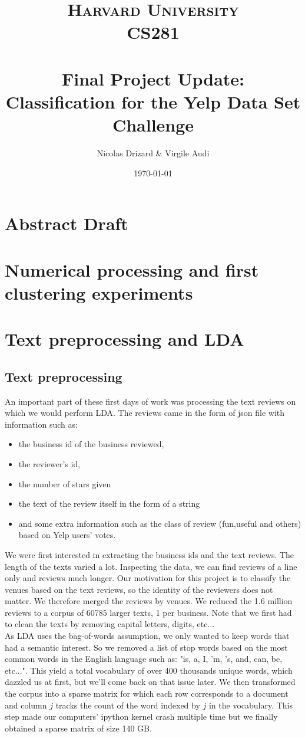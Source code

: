 \documentclass[paper=a4, fontsize=11pt]{scrartcl} %
\title{	
\normalfont \normalsize 
\textsc{Harvard University} \\[25pt]
\textsc{CS281} \\[25pt]
\horrule{0.5pt} \\[0.4cm] 
\huge Final Project Update: \\
\huge Classification for the Yelp Data Set Challenge
\horrule{2pt} \\[0.5cm]
}
\author{Nicolas Drizard \& Virgile Audi}
\date{\normalsize\today}
\numberwithin{equation}{section}
\numberwithin{figure}{section}
\numberwithin{table}{section}
\begin{document}
\maketitle

\section{Abstract Draft}

\section{Numerical processing and first clustering experiments}

\section{Text preprocessing and LDA}
\subsection{Text preprocessing}
An important part of these first days of work was processing the text reviews on which we would perform LDA. The reviews came in the form of json file with information such as:
\begin{itemize}
\item the business id of the business reviewed,
\item the reviewer's id,
\item the number of stars given
\item the text of the review itself in the form of a string
\item and some extra information such as the class of review (fun,useful and others) based on Yelp users' votes.
\end{itemize}

We were first interested in extracting the business ids and the text reviews. The length of the texts varied a lot. Inspecting the data, we can find reviews of a line only and reviews much longer. Our motivation for this project is to classify the venues based on the text reviews, so the identity of the reviewers does not matter. We therefore merged the reviews by venues. We reduced the 1.6 million reviews to a corpus of 60785 larger texts, 1 per business. Note that we first had to clean the texts by removing capital letters, digits, etc... \\

As LDA uses the bag-of-words assumption, we only wanted to keep words that had a semantic interest. So we removed a list of stop words based on the most common words in the English language such as: "is, a, I, 'm, 's, and, can, be, etc...". This yield a total vocabulary of over 400 thousands unique words, which dazzled us at first, but we'll come back on that issue later. We then transformed the corpus into a sparse matrix for which each row corresponds to a document and column $j$ tracks the count of the word indexed by $j$ in the vocabulary. This step made our computers' ipython kernel crash multiple time but we finally obtained a sparse matrix of size 140 GB.\\
\end{document}
